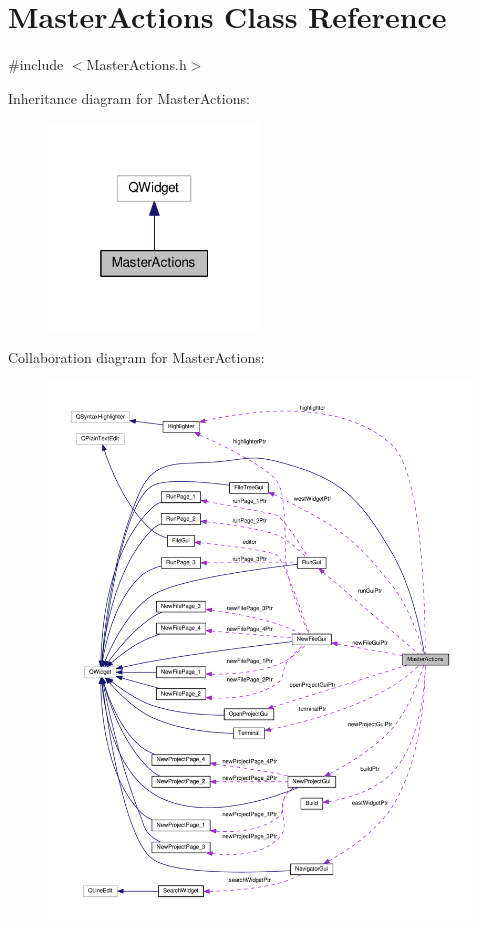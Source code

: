 \hypertarget{class_master_actions}{\section{Master\-Actions Class Reference}
\label{class_master_actions}
}


{\ttfamily \#include $<$Master\-Actions.\-h$>$}



Inheritance diagram for Master\-Actions\-:\nopagebreak
\begin{figure}[H]
\begin{center}
\leavevmode
\includegraphics[width=160pt]{class_master_actions__inherit__graph}
\end{center}
\end{figure}


Collaboration diagram for Master\-Actions\-:
\nopagebreak
\begin{figure}[H]
\begin{center}
\leavevmode
\includegraphics[width=350pt]{class_master_actions__coll__graph}
\end{center}
\end{figure}
